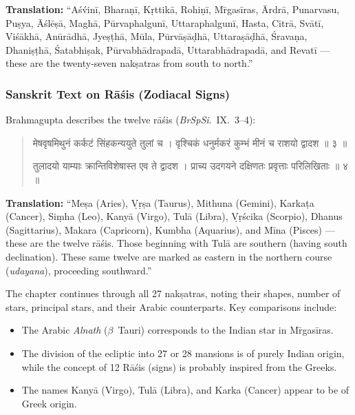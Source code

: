 \documentclass[11pt,a4paper]{article}
\newcommand{\dev}[1]{{\devanagarifont #1}}
\newenvironment{sanskritverse}{%
  \begin{quote}
  \devanagarifont
  \small
  \color{titlecolor}
}{\end{quote}}
\theoremstyle{definition}
\begin{document}
\textbf{Translation:} ``A\'s\'vin\=i, Bhara\d{n}\=i, K\d{r}ttik\=a, Rohi\d{n}\=i, M\=rgas\=iras, \=Ardr\=a, Punarvasu, Pu\d{s}ya, \=A\'sl\=e\d{s}\=a, Magh\=a, P\=urvaphalgun\=i, Uttaraphalgun\=i, Hasta, Citr\=a, Sv\=at\=i, Vi\'s\=akh\=a, An\=ur\=adh\=a, Jye\d{s}\d{t}h\=a, M\=ula, P\=urv\=a\d{s}\=a\d{d}h\=a, Uttara\d{s}\=a\d{d}h\=a, \'Srava\d{n}a, Dhani\d{s}\d{t}h\=a, \'Satabhi\d{s}ak, P\=urvabh\=adrapad\=a, Uttarabh\=adrapad\=a, and Revat\=i --- these are the twenty-seven nak\d{s}atras from south to north.''

\vspace{0.3cm}



\subsubsection{Sanskrit Text on R\=a\'sis (Zodiacal Signs)}

Brahmagupta describes the twelve r\=a\'sis (\textit{BrSpSi}.\ IX.\ 3--4):

\begin{sanskritverse}
\dev{मेषवृषमिथुनं कर्कटं सिंहकन्ययुते तुलां च ।}
\dev{वृश्चिकं धनुर्मकरं कुम्भं मीनं च राशयो द्वादश ॥ ३ ॥}

\dev{तुलादयो याम्याः क्रान्तिविशेषास्त एव ते द्वादश ।}
\dev{प्राच्य उदगयने दक्षिणतः प्रवृत्ताः परिलिखिताः ॥ ४ ॥}
\end{sanskritverse}

\textbf{Translation:} ``Me\d{s}a (Aries), \d{V}\d{r}\d{s}a (Taurus), Mithuna (Gemini), Karka\d{t}a (Cancer), Si\d{m}ha (Leo), Kany\=a (Virgo), Tul\=a (Libra), \d{V}\d{r}\'scika (Scorpio), Dhanus (Sagittarius), Makara (Capricorn), Kumbha (Aquarius), and M\=ina (Pisces) --- these are the twelve r\=a\'sis. Those beginning with Tul\=a are southern (having south declination). These same twelve are marked as eastern in the northern course (\textit{udayana}), proceeding southward.''

\vspace{0.3cm}

The chapter continues through all 27 nak\d{s}atras, noting their shapes, number of stars, principal stars, and their Arabic counterparts. Key comparisons include:

\begin{itemize}
  \item The Arabic \textit{Alnath} ($\beta$~Tauri) corresponds to the Indian star in M\=rgas\=iras.
  \item The division of the ecliptic into 27 or 28 mansions is of purely Indian origin, while the concept of 12 R\=a\'sis (signs) is probably inspired from the Greeks.
  \item The names Kany\=a (Virgo), Tul\=a (Libra), and Karka (Cancer) appear to be of Greek origin.
\end{itemize}
\end{document}
